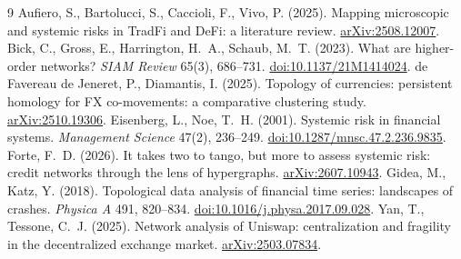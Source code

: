\documentclass[10pt,twocolumn]{article}
\newcommand{\doi}[1]{\href{https://doi.org/#1}{doi:#1}}
\newcommand{\arxiv}[1]{\href{https://arxiv.org/abs/#1}{arXiv:#1}}
\begin{document}
\begin{thebibliography}{9}
\small
 Aufiero, S., Bartolucci, S.,
Caccioli, F., Vivo, P. (2025). Mapping microscopic and systemic risks in TradFi and
DeFi: a literature review. \arxiv{2508.12007}.
 Bick, C., Gross, E., Harrington, H.~A., Schaub,
M.~T. (2023). What are higher-order networks? \emph{SIAM Review} 65(3), 686--731.
\doi{10.1137/21M1414024}.
 de Favereau de Jeneret,
P., Diamantis, I. (2025). Topology of currencies: persistent homology for FX
co-movements: a comparative clustering study. \arxiv{2510.19306}.
 Eisenberg, L., Noe, T.~H. (2001).
Systemic risk in financial systems. \emph{Management Science} 47(2), 236--249.
\doi{10.1287/mnsc.47.2.236.9835}.
 Forte, F.~D. (2026). It takes two to tango, but more
to assess systemic risk: credit networks through the lens of hypergraphs.
\arxiv{2607.10943}.
 Gidea, M., Katz, Y. (2018). Topological data
analysis of financial time series: landscapes of crashes. \emph{Physica A} 491,
820--834. \doi{10.1016/j.physa.2017.09.028}.
 Yan, T., Tessone, C.~J. (2025). Network
analysis of Uniswap: centralization and fragility in the decentralized exchange
market. \arxiv{2503.07834}.
\end{thebibliography}
\end{document}
